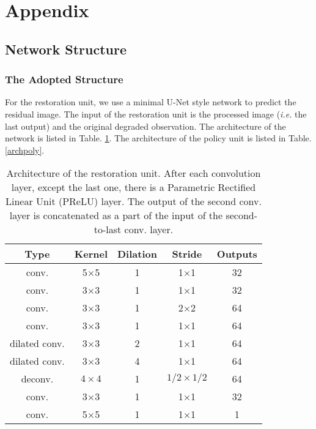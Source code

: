 \documentclass{article} %
\begin{document}

\small

\normalsize

\newpage

\section*{Appendix}

\subsection{Network Structure}

\subsubsection{The Adopted Structure}

For the restoration unit, we use a minimal
U-Net \citep{ronneberger2015u} style network to predict the residual image.
The input of the restoration unit is the processed image (\textit{i.e.} the
last output) and the original degraded observation. The architecture of
the network is listed in Table. \ref{arch}.
The architecture of the policy unit is listed in Table. \ref{archpoly}.

\begin{table}[htp!]
	\caption{Architecture of the restoration unit. After each convolution layer,
		except the last one, there is a Parametric Rectified Linear Unit (PReLU) layer.
		The output of the second conv. layer is concatenated as a part of the input of
		the second-to-last conv. layer.}
	\label{arch}
	\centering
	\begin{tabular}{ccccc}
		\toprule
		Type & Kernel & Dilation & Stride & Outputs\\
		\hline\hline
		conv.& 5$\times$5& 1 & 1$\times$1 &32\\
		conv.& 3$\times$3& 1 & 1$\times$1 &32\\
		\hline
		conv.& 3$\times$3& 1 & 2$\times$2 &64\\
		
		conv.& 3$\times$3&1&1$\times$1&64\\
		dilated conv.&3$\times$3&2&1$\times$1&64\\
		dilated conv.&3$\times$3&4&1$\times$1&64\\
		\hline
		deconv.&$4\times 4$&1&$1/2 \times1/2$&64\\
		conv.& 3$\times$3&1&1$\times$1&32\\
		conv.& 5$\times$5&1&1$\times$1&1\\
		\hline		
	\end{tabular}
\end{table}
\end{document}
